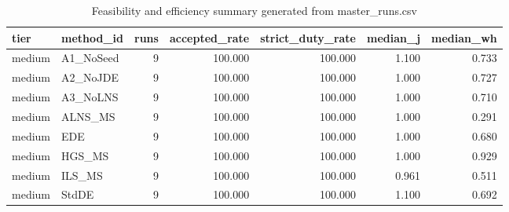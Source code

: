 \begin{table}[!t]
\centering
\caption{Feasibility and efficiency summary generated from master_runs.csv}
\label{tab:feasibility_summary_generated}
\begin{tabular}{llrrrrr}
\toprule
tier & method_id & runs & accepted_rate & strict_duty_rate & median_j & median_wh \\
\midrule
medium & A1_NoSeed & 9 & 100.000 & 100.000 & 1.100 & 0.733 \\
medium & A2_NoJDE & 9 & 100.000 & 100.000 & 1.000 & 0.727 \\
medium & A3_NoLNS & 9 & 100.000 & 100.000 & 1.000 & 0.710 \\
medium & ALNS_MS & 9 & 100.000 & 100.000 & 1.000 & 0.291 \\
medium & EDE & 9 & 100.000 & 100.000 & 1.000 & 0.680 \\
medium & HGS_MS & 9 & 100.000 & 100.000 & 1.000 & 0.929 \\
medium & ILS_MS & 9 & 100.000 & 100.000 & 0.961 & 0.511 \\
medium & StdDE & 9 & 100.000 & 100.000 & 1.100 & 0.692 \\
\bottomrule
\end{tabular}

\end{table}